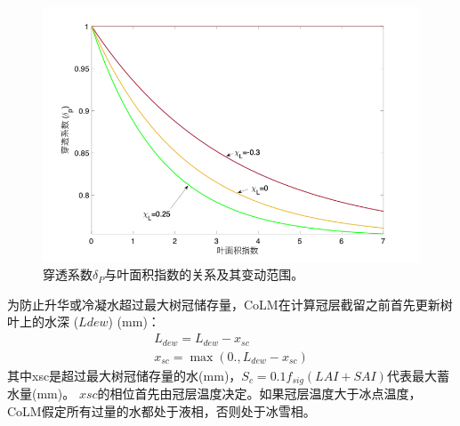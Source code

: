 {
\begin{figure}[]
\centering
\includegraphics{Figures/陆地表面的水分循环/穿透系数与叶面积指数.png}
\caption{穿透系数$\delta_P$与叶面积指数的关系及其变动范围。}
\label{fig:穿透系数与叶面积指数}
\end{figure}
}
为防止升华或冷凝水超过最大树冠储存量，CoLM在计算冠层截留之前首先更新树叶上的水深 ($Ldew$) (mm)：
\begin{equation}
\begin{array}{c}L_{d e w}=L_{d e w}-x_{s c} \\ x_{s c}=\max \left(0 ., L_{d e w}-x_{s c}\right)\end{array}
\end{equation}
其中xsc是超过最大树冠储存量的水(mm)，$S_c=0.1f_{sig}\left(LAI+SAI\right)$代表最大蓄水量(mm)。
$xsc$的相位首先由冠层温度决定。如果冠层温度大于冰点温度，CoLM假定所有过量的水都处于液相，否则处于冰雪相。


